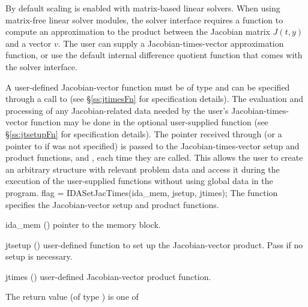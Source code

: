 {{  By default scaling is enabled with matrix-based linear solvers.
}
When using matrix-free linear solver modules, the {\idals} solver
interface requires a function to compute an approximation to the
product between the Jacobian matrix $J(t,y)$ and a vector $v$. The
user can supply a Jacobian-times-vector approximation function,
or use the default internal difference quotient function
that comes with the {\idals} solver interface.

A user-defined
Jacobian-vector function must be of type 
and can be specified through a call to 
(see \S\ref{ss:jtimesFn} for specification details).
The evaluation and processing of any Jacobian-related data needed by
the user's Jacobian-times-vector function may be done in the optional
user-supplied function  (see \S\ref{ss:jtsetupFn} for
specification details).
The pointer  received through  (or a
pointer to  if  was not specified)
is passed to the Jacobian-times-vector setup and product functions,  and
, each time they are called.  This allows the user to
create an arbitrary structure with relevant problem data and access it
during the execution of the user-supplied functions
without using global data in the program.
{
  flag = IDASetJacTimes(ida\_mem, jsetup, jtimes);
}
{
  The function  specifies the Jacobian-vector
  setup and product functions.
}
{
  \begin{args}
  \item[ida\_mem] ()
    pointer to the {\ida} memory block.
  \item[jtsetup] ()
    user-defined function to set up the Jacobian-vector product.
    Pass  if no setup is necessary.
  \item[jtimes] ()
    user-defined Jacobian-vector product function.
  \end{args}
}
{
  The return value  (of type ) is one of
  \begin{args}
  \item[\Id{IDALS\_SUCCESS}]

\end{args}}}
